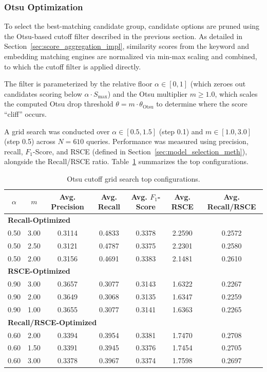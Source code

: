 \subsubsection{Otsu Optimization}

To select the best-matching candidate group, candidate options are pruned using the Otsu-based cutoff filter described in the previous section. As detailed in Section~\ref{sec:score_aggregation_impl}, similarity scores from the keyword and embedding matching engines are normalized via min-max scaling and combined, to which the cutoff filter is applied directly. 

The filter is parameterized by the relative floor $\alpha \in [0, 1]$ (which zeroes out candidates scoring below $\alpha \cdot S_{\text{max}}$) and the Otsu multiplier $m \ge 1.0$, which scales the computed Otsu drop threshold $\theta = m \cdot \theta_{\text{Otsu}}$ to determine where the score ``cliff'' occurs.

A grid search was conducted over $\alpha \in [0.5, 1.5]$ (step 0.1) and $m \in [1.0, 3.0]$ (step 0.5) across $N=610$ queries. Performance was measured using precision, recall, $F_1$-Score, and \ac{RSCE} (defined in Section~\ref{sec:model_selection_meth}), alongside the Recall/\ac{RSCE} ratio. Table~\ref{tab:otsu_grid_search} summarizes the top configurations.

\begin{table}[htbp]
\centering
\caption{Otsu cutoff grid search top configurations.}
\label{tab:otsu_grid_search}
\begin{tabular}{ccccccc}
\toprule
$\alpha$ & $m$ & Avg. Precision & Avg. Recall & Avg. $F_1$-Score & Avg. RSCE & Avg. Recall/RSCE \\
\midrule
\multicolumn{7}{l}{\textbf{Recall-Optimized}} \\
0.50 & 3.00 & 0.3114 & 0.4833 & 0.3378 & 2.2590 & 0.2572 \\
0.50 & 2.50 & 0.3121 & 0.4787 & 0.3375 & 2.2301 & 0.2580 \\
0.50 & 2.00 & 0.3156 & 0.4691 & 0.3383 & 2.1481 & 0.2610 \\
\midrule
\multicolumn{7}{l}{\textbf{RSCE-Optimized}} \\
0.90 & 3.00 & 0.3657 & 0.3077 & 0.3143 & 1.6322 & 0.2267 \\
0.90 & 2.00 & 0.3649 & 0.3068 & 0.3135 & 1.6347 & 0.2259 \\
0.90 & 1.00 & 0.3655 & 0.3077 & 0.3141 & 1.6363 & 0.2265 \\
\midrule
\multicolumn{7}{l}{\textbf{Recall/RSCE-Optimized}} \\
0.60 & 2.00 & 0.3394 & 0.3954 & 0.3381 & 1.7470 & 0.2708 \\
0.60 & 1.50 & 0.3391 & 0.3945 & 0.3376 & 1.7454 & 0.2705 \\
0.60 & 3.00 & 0.3378 & 0.3967 & 0.3374 & 1.7598 & 0.2697 \\
\bottomrule
\end{tabular}
\end{table}

